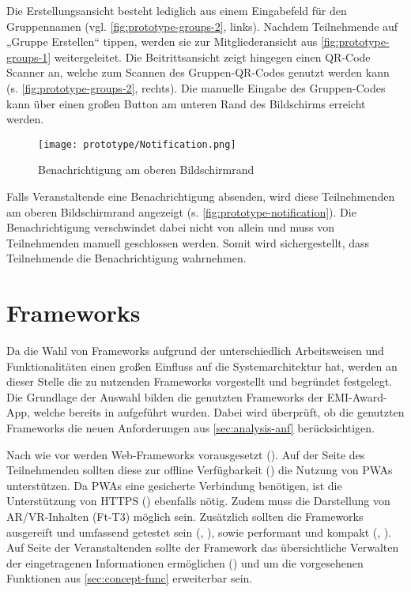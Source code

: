 Die Erstellungsansicht besteht lediglich aus einem Eingabefeld für den
Gruppennamen (vgl. \autoref{fig:prototype-groups-2}, links). Nachdem
Teilnehmende auf „Gruppe Erstellen“ tippen, werden sie zur Mitgliederansicht aus
\autoref{fig:prototype-groups-1} weitergeleitet. Die Beitrittsansicht zeigt
hingegen einen QR-Code Scanner an, welche zum Scannen des Gruppen-QR-Codes
genutzt werden kann (s. \autoref{fig:prototype-groups-2}, rechts). Die manuelle
Eingabe des Gruppen-Codes kann über einen großen Button am unteren Rand des Bildschirms
erreicht werden.

\begin{figure}[htpb]
    \centering
    \texttt{[image: prototype/Notification.png]}
    \caption{Benachrichtigung am oberen Bildschirmrand}
    \label{fig:prototype-notification}
\end{figure}

Falls Veranstaltende eine Benachrichtigung absenden, wird diese Teilnehmenden am
oberen Bildschirmrand angezeigt (s. \autoref{fig:prototype-notification}). Die
Benachrichtigung verschwindet dabei nicht von allein und muss von Teilnehmenden
manuell geschlossen werden. Somit wird sichergestellt, dass Teilnehmende die
Benachrichtigung wahrnehmen.


\section{Frameworks} \label{sec:frameworks}

Da die Wahl von Frameworks aufgrund der unterschiedlich Arbeitsweisen und
Funktionalitäten einen großen Einfluss auf die Systemarchitektur hat, werden an
dieser Stelle die zu nutzenden Frameworks vorgestellt und begründet festgelegt.
Die Grundlage der Auswahl bilden die genutzten Frameworks der EMI-Award-App,
welche bereits in  aufgeführt wurden. Dabei wird
überprüft, ob die genutzten Frameworks die neuen Anforderungen aus
\autoref{sec:analysis-anf} berücksichtigen.

Nach wie vor werden Web-Frameworks vorausgesetzt (). Auf der Seite
des Teilnehmenden sollten diese zur offline Verfügbarkeit () die
Nutzung von \acp{PWA} unterstützen. Da \acp{PWA} eine gesicherte Verbindung
benötigen, ist die Unterstützung von HTTPS () ebenfalls nötig. Zudem
muss die Darstellung von \ac{AR}/\ac{VR}-Inhalten (Ft-T3) möglich sein. Zusätzlich sollten
die Frameworks ausgereift und umfassend getestet sein (,
), sowie performant und kompakt (, ). Auf
Seite der Veranstaltenden sollte der Framework das übersichtliche Verwalten der
eingetragenen Informationen ermöglichen () und um die vorgesehenen
Funktionen aus \autoref{sec:concept-func} erweiterbar sein.

